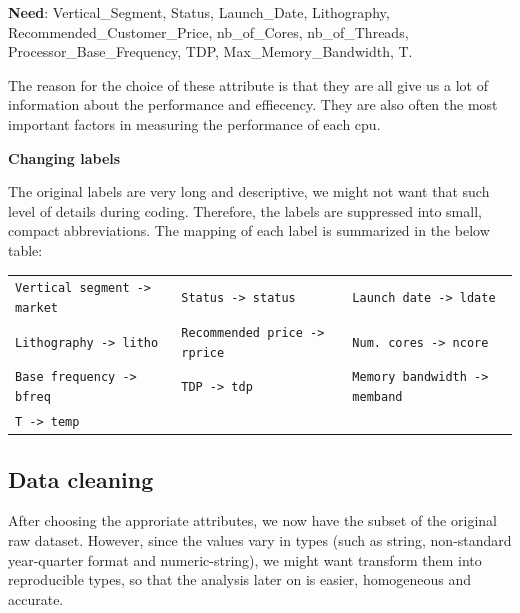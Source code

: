 \textbf{Need}: Vertical\_Segment, Status, Launch\_Date, Lithography, Recommended\_Customer\_Price, nb\_of\_Cores, nb\_of\_Threads, Processor\_Base\_Frequency, TDP, Max\_Memory\_Bandwidth, T.

The reason for the choice of these attribute is that they are all give us a lot of information about the performance and effiecency. They are also often the most important factors in measuring the performance of each cpu.


\textbf{Changing labels}

The original labels are very long and descriptive, we might not want that such level of details during coding. Therefore, the labels are suppressed
into small, compact abbreviations. The mapping of each label is summarized in the below table:

\begin{center}
    \begin{tabularx}{\linewidth}{l*{2}{X}}
        \toprule
        \verb|Vertical segment -> market| & \verb|Status -> status|  & \verb|Launch date -> ldate|      \\
        \verb|Lithography -> litho| & \verb|Recommended price -> rprice|  & \verb|Num. cores -> ncore|  \\
        \verb|Base frequency -> bfreq| & \verb|TDP -> tdp|   & \verb|Memory bandwidth -> memband|       \\
        \verb|T -> temp| & &                                                                            \\
        \bottomrule
    \end{tabularx}
\end{center}










\subsection{Data cleaning}
After choosing the approriate attributes, we now have the subset of the original raw dataset. 
However, since the values vary in types (such as string, non-standard year-quarter format and numeric-string),
we might want transform them into reproducible types, so that the analysis later on is easier, homogeneous and accurate.

